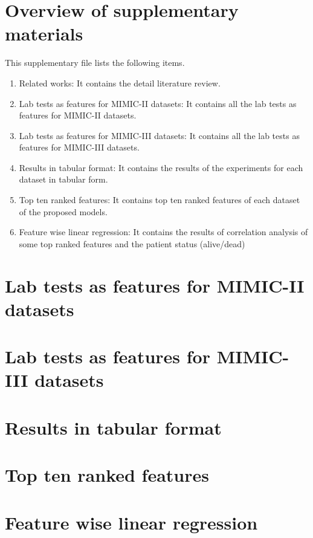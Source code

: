 \section{Overview of supplementary materials}
This supplementary file lists the following items.  
\begin{enumerate}
	\item Related works: It contains the detail literature review. 
	\item Lab tests as features for MIMIC-II datasets: It contains all the lab tests as features for MIMIC-II datasets. 
	\item Lab tests as features for MIMIC-III datasets: It contains all the lab tests as features for MIMIC-III datasets.					
	\item Results in tabular format: It contains the results of the experiments for each dataset in tabular form. 				
	\item Top ten ranked features: It contains top ten ranked features of each dataset of the proposed models.
	\item Feature wise linear regression: It contains the results of correlation analysis of some top ranked features and the patient status (alive/dead) 
\end{enumerate}



\section{Lab tests as features for MIMIC-II datasets} 


\section{Lab tests as features for MIMIC-III datasets} 


\section{Results in tabular format} 


\section{Top ten ranked features} 


\section{Feature wise linear regression} 

